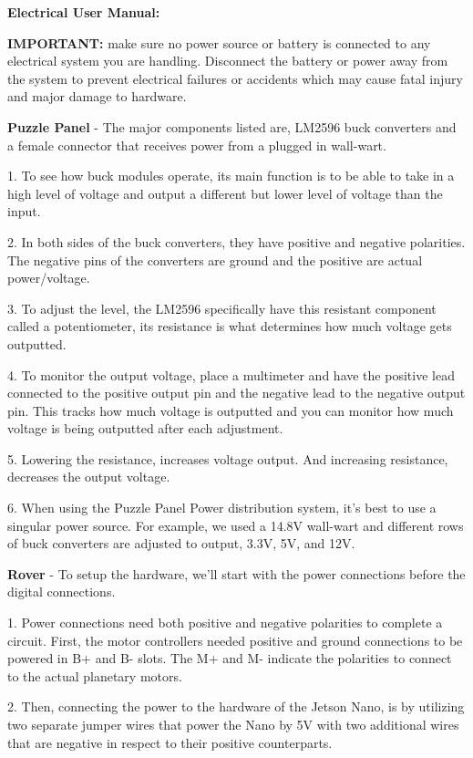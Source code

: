 \documentclass[a4paper, 10pt]{article}
\begin{document}
\textbf{Electrical User Manual:}

\textbf{IMPORTANT:} make sure no power source or battery is connected to any electrical system you are handling. Disconnect the battery or power away from the system to prevent electrical failures or accidents which may cause fatal injury and major damage to hardware.  

\textbf{Puzzle Panel} - The major components listed are, LM2596 buck converters and a female connector that receives power from a plugged in wall-wart.

1. To see how buck modules operate, its main function is to be able to take in a high level of voltage and output a different but lower level of voltage than the input. 

2. In both sides of the buck converters, they have positive and negative polarities. The negative pins of the converters are ground and the positive are actual power/voltage.  

3. To adjust the level, the LM2596 specifically have this resistant component called a potentiometer, its resistance is what determines how much voltage gets outputted. 

4. To monitor the output voltage, place a multimeter and have the positive lead connected to the positive output pin and the negative lead to the negative output pin. This tracks how much voltage is outputted and you can monitor how much voltage is being outputted after each adjustment.

5. Lowering the resistance, increases voltage output. And increasing resistance, decreases the output voltage. 

6. When using the Puzzle Panel Power distribution system, it's best to use a singular power source. For example, we used a 14.8V wall-wart and different rows of buck converters are adjusted to output, 3.3V, 5V, and 12V.

\textbf{Rover} - To setup the hardware, we'll start with the power connections before the digital connections.

1. Power connections need both positive and negative polarities to complete a circuit. First, the motor controllers needed positive and ground connections to be powered in B+ and B- slots. The M+ and M- indicate the polarities to connect to the actual planetary motors. 

2. Then, connecting the power to the hardware of the Jetson Nano, is by utilizing two separate jumper wires that power the Nano by 5V with two additional wires that are negative in respect to their positive counterparts.  
\end{document}
